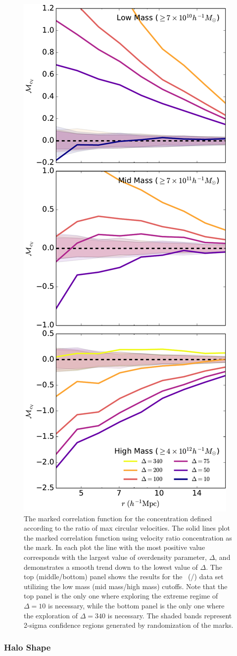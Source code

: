 \documentclass[usenatbib]{mnras}
\begin{document}
\begin{figure}
	\centering
	\includegraphics[width=.4\textwidth]{all_mcf_cV.pdf}
	\caption{The marked correlation function for the concentration defined according to the ratio of max circular velocities. The solid lines plot the marked correlation function using velocity ratio concentration as the mark. In each plot the line with the most 
positive value corresponds with the largest value of overdensity parameter, 
$\Delta$, and demonstrates a smooth trend down to the lowest value of 
$\Delta$. The top (middle/bottom) panel shows the results for the
\simA \ (\simB /\simC) data set utilizing the low mass (mid mass/high mass) cutoffs. Note
that the top panel is the only one where exploring the extreme regime of $\Delta = 10$ is
necessary, while the bottom panel is the only one where the exploration of $\Delta = 340$
is necessary. The shaded bands represent 2-sigma confidence regions generated by randomization of the marks.
}
	\label{fig:cc_mcf_cV}
\end{figure}


\subsubsection{Halo Shape}
\end{document}
